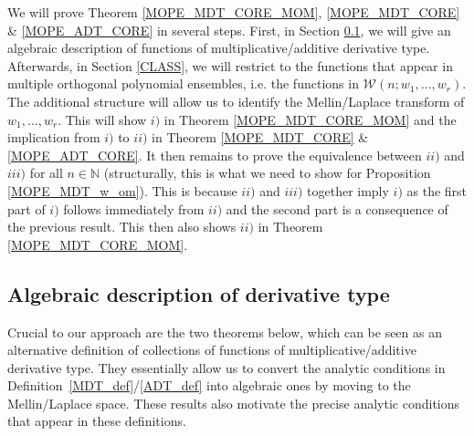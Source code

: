 \documentclass[a4paper,12pt,oneside]{article}
\theoremstyle{definition}
\newcommand{\N}{\mathbb{N}}
\begin{document}
We will prove Theorem \ref{MOPE_MDT_CORE_MOM}, \ref{MOPE_MDT_CORE} \& \ref{MOPE_ADT_CORE} in several steps. First, in Section \ref{DT},  we will give an algebraic description of functions of multiplicative/additive derivative type. Afterwards, in Section \ref{CLASS}, we will restrict to the functions that appear in multiple orthogonal polynomial ensembles, i.e. the functions in 
$\mathcal{W}(n;w_1,\dots,w_r)$. The additional structure will allow us to identify the Mellin/Laplace transform of $w_1,\dots,w_r$. This will show $i)$ in Theorem \ref{MOPE_MDT_CORE_MOM} and the implication from $i)$ to $ii)$ in Theorem \ref{MOPE_MDT_CORE} \& \ref{MOPE_ADT_CORE}. It then remains to prove the equivalence between $ii)$ and $iii)$ for all $n\in\N$ (structurally, this is what we need to show for Proposition \ref{MOPE_MDT_w_om}). This is because $ii)$ and $iii)$ together imply $i)$ as the first part of $i)$ follows immediately from $ii)$ and the second part is a consequence of the previous result. This then also shows $ii)$ in Theorem \ref{MOPE_MDT_CORE_MOM}.

\subsection{Algebraic description of derivative type} \label{DT}

Crucial to our approach are the two theorems below, which can be seen as an alternative definition of collections of functions of multiplicative/additive derivative type. They essentially allow us to convert the analytic conditions in Definition~\ref{MDT_def}/\ref{ADT_def} into algebraic ones by moving to the Mellin/Laplace space. These results also motivate the precise analytic conditions that appear in these definitions.
\end{document}

